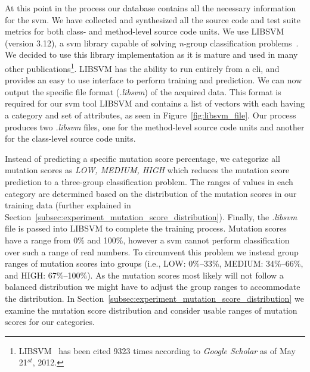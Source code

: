 At this point in the process our database contains all the necessary information for the \gls{svm}. We have collected and synthesized all the source code and test suite metrics for both class- and method-level source code units. We use LIBSVM (version 3.12), a \gls{svm} library capable of solving \emph{n}-group classification problems~\cite{CL11}. We decided to use this library implementation as it is mature and used in many other publications\footnote{LIBSVM~\cite{CL11} has been cited 9323 times according to \emph{Google Scholar} as of May 21$^{st}$, 2012.}. LIBSVM has the ability to run entirely from a \gls{cli}, and provides an easy to use interface to perform training and prediction. We can now output the specific file format (\emph{.libsvm}) of the acquired data. This format is required for our \gls{svm} tool LIBSVM and contains a list of vectors with each having a category and set of attributes, as seen in Figure~\ref{fig:libsvm_file}. Our process produces two \emph{.libsvm} files, one for the method-level source code units and another for the class-level source code units.

Instead of predicting a specific mutation score percentage, we categorize all mutation scores as \textit{LOW, MEDIUM, HIGH} which reduces the mutation score prediction to a three-group classification problem. The ranges of values in each category are determined based on the distribution of the mutation scores in our training data (further explained in Section~\ref{subsec:experiment_mutation_score_distribution}). Finally, the \emph{.libsvm} file is passed into LIBSVM to complete the training process. Mutation scores have a range from 0\% and 100\%, however a \gls{svm} cannot perform classification over such a range of real numbers. To circumvent this problem we instead group ranges of mutation scores into groups (i.e., LOW: 0\%--33\%, MEDIUM: 34\%--66\%, and HIGH: 67\%--100\%). As the mutation scores most likely will not follow a balanced distribution we might have to adjust the group ranges to accommodate the distribution. In Section~\ref{subsec:experiment_mutation_score_distribution} we examine the mutation score distribution and consider usable ranges of mutation scores for our categories.


